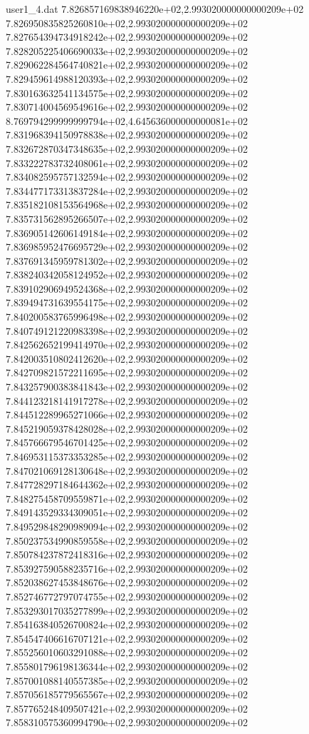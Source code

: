 \begin{filecontents}{user1_4.dat}
7.826857169838946220e+02,2.993020000000000209e+02
7.826950835825260810e+02,2.993020000000000209e+02
7.827654394734918242e+02,2.993020000000000209e+02
7.828205225406690033e+02,2.993020000000000209e+02
7.829062284564740821e+02,2.993020000000000209e+02
7.829459614988120393e+02,2.993020000000000209e+02
7.830163632541134575e+02,2.993020000000000209e+02
7.830714004569549616e+02,2.993020000000000209e+02
8.769794299999999794e+02,4.645636000000000081e+02
7.831968394150978838e+02,2.993020000000000209e+02
7.832672870347348635e+02,2.993020000000000209e+02
7.833222783732408061e+02,2.993020000000000209e+02
7.834082595757132594e+02,2.993020000000000209e+02
7.834477173313837284e+02,2.993020000000000209e+02
7.835182108153564968e+02,2.993020000000000209e+02
7.835731562895266507e+02,2.993020000000000209e+02
7.836905142606149184e+02,2.993020000000000209e+02
7.836985952476695729e+02,2.993020000000000209e+02
7.837691345959781302e+02,2.993020000000000209e+02
7.838240342058124952e+02,2.993020000000000209e+02
7.839102906949524368e+02,2.993020000000000209e+02
7.839494731639554175e+02,2.993020000000000209e+02
7.840200583765996498e+02,2.993020000000000209e+02
7.840749121220983398e+02,2.993020000000000209e+02
7.842562652199414970e+02,2.993020000000000209e+02
7.842003510802412620e+02,2.993020000000000209e+02
7.842709821572211695e+02,2.993020000000000209e+02
7.843257900383841843e+02,2.993020000000000209e+02
7.844123218141917278e+02,2.993020000000000209e+02
7.844512289965271066e+02,2.993020000000000209e+02
7.845219059378428028e+02,2.993020000000000209e+02
7.845766679546701425e+02,2.993020000000000209e+02
7.846953115373353285e+02,2.993020000000000209e+02
7.847021069128130648e+02,2.993020000000000209e+02
7.847728297184644362e+02,2.993020000000000209e+02
7.848275458709559871e+02,2.993020000000000209e+02
7.849143529334309051e+02,2.993020000000000209e+02
7.849529848290989094e+02,2.993020000000000209e+02
7.850237534990859558e+02,2.993020000000000209e+02
7.850784237872418316e+02,2.993020000000000209e+02
7.853927590588235716e+02,2.993020000000000209e+02
7.852038627453848676e+02,2.993020000000000209e+02
7.852746772797074755e+02,2.993020000000000209e+02
7.853293017035277899e+02,2.993020000000000209e+02
7.854163840526700824e+02,2.993020000000000209e+02
7.854547406616707121e+02,2.993020000000000209e+02
7.855256010603291088e+02,2.993020000000000209e+02
7.855801796198136344e+02,2.993020000000000209e+02
7.857001088140557385e+02,2.993020000000000209e+02
7.857056185779565567e+02,2.993020000000000209e+02
7.857765248409507421e+02,2.993020000000000209e+02
7.858310575360994790e+02,2.993020000000000209e+02

\end{filecontents}
